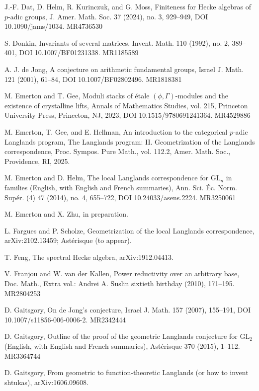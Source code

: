 \begin{refs}
\item[{[20]}] J.-F. Dat, D. Helm, R. Kurinczuk, and G. Moss, Finiteness for Hecke algebras of $p$-adic groups, J. Amer. Math. Soc. 37 (2024), no. 3, 929--949, DOI 10.1090/jams/1034. MR4736530
\item[{[21]}] S. Donkin, Invariants of several matrices, Invent. Math. 110 (1992), no. 2, 389--401, DOI 10.1007/BF01231338. MR1185589
\item[{[22]}] A. J. de Jong, A conjecture on arithmetic fundamental groups, Israel J. Math. 121 (2001), 61--84, DOI 10.1007/BF02802496. MR1818381
\item[{[23]}] M. Emerton and T. Gee, Moduli stacks of \'etale $(\phi,\Gamma)$-modules and the existence of crystalline lifts, Annals of Mathematics Studies, vol. 215, Princeton University Press, Princeton, NJ, 2023, DOI 10.1515/9780691241364. MR4529886
\item[{[24]}] M. Emerton, T. Gee, and E. Hellman, An introduction to the categorical $p$-adic Langlands program, The Langlands program: II. Geometrization of the Langlands correspondence, Proc. Sympos. Pure Math., vol. 112.2, Amer. Math. Soc., Providence, RI, 2025.
\item[{[25]}] M. Emerton and D. Helm, The local Langlands correspondence for $\mathrm{GL}_n$ in families (English, with English and French summaries), Ann. Sci. \'Ec. Norm. Sup\'er. (4) 47 (2014), no. 4, 655--722, DOI 10.24033/asens.2224. MR3250061
\item[{[26]}] M. Emerton and X. Zhu, in preparation.
\item[{[27]}] L. Fargues and P. Scholze, Geometrization of the local Langlands correspondence, arXiv:2102.13459; Ast\'erisque (to appear).
\item[{[28]}] T. Feng, The spectral Hecke algebra, arXiv:1912.04413.
\item[{[29]}] V. Franjou and W. van der Kallen, Power reductivity over an arbitrary base, Doc. Math., Extra vol.: Andrei A. Suslin sixtieth birthday (2010), 171--195. MR2804253
\item[{[30]}] D. Gaitsgory, On de Jong's conjecture, Israel J. Math. 157 (2007), 155--191, DOI 10.1007/s11856-006-0006-2. MR2342444
\item[{[31]}] D. Gaitsgory, Outline of the proof of the geometric Langlands conjecture for $\mathrm{GL}_2$ (English, with English and French summaries), Ast\'erisque 370 (2015), 1--112. MR3364744
\item[{[32]}] D. Gaitsgory, From geometric to function-theoretic Langlands (or how to invent shtukas), arXiv:1606.09608.

\end{refs}
